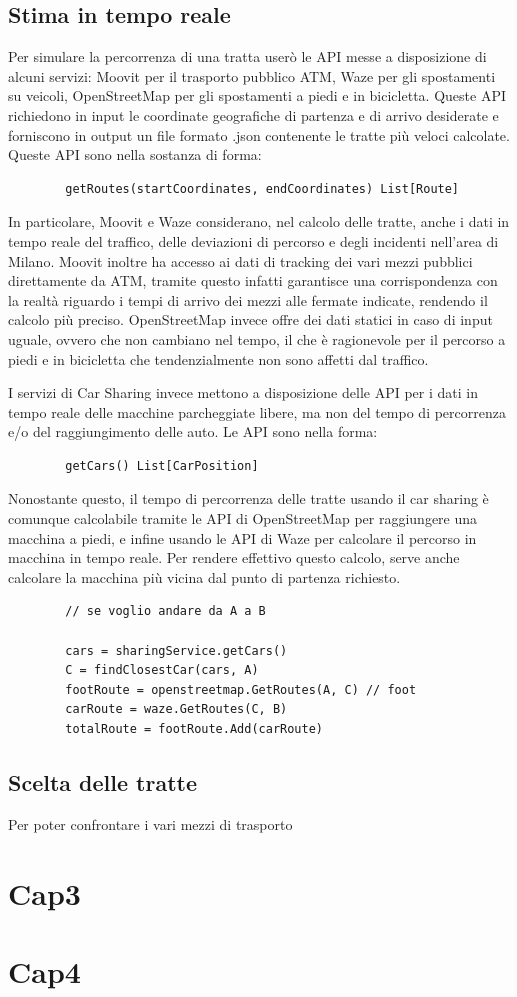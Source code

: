 \documentclass[a4paper]{report}
\begin{document}
		\section{Stima in tempo reale}
		{\large
			Per simulare la percorrenza di una tratta userò le API messe a disposizione di alcuni servizi: Moovit per il trasporto pubblico ATM, Waze per gli spostamenti su veicoli, OpenStreetMap per gli spostamenti a piedi e in bicicletta. Queste API richiedono in input le coordinate geografiche di partenza e di arrivo desiderate e forniscono in output un file formato .json contenente le tratte più veloci calcolate. Queste API sono nella sostanza di forma:
		}
	
		\begin{verbatim}
		getRoutes(startCoordinates, endCoordinates) List[Route]
		\end{verbatim}
	
		{\large
			In particolare, Moovit e Waze considerano, nel calcolo delle tratte, anche i dati in tempo reale del traffico, delle deviazioni di percorso e degli incidenti nell'area di Milano. Moovit inoltre ha accesso ai dati di tracking dei vari mezzi pubblici direttamente da ATM, tramite questo infatti garantisce una corrispondenza con la realtà riguardo i tempi di arrivo dei mezzi alle fermate indicate, rendendo il calcolo più preciso. OpenStreetMap invece offre dei dati statici in caso di input uguale, ovvero che non cambiano nel tempo, il che è ragionevole per il percorso a piedi e in bicicletta che tendenzialmente non sono affetti dal traffico.
		}
	
		{\large
			I servizi di Car Sharing invece mettono a disposizione delle API per i dati in tempo reale delle macchine parcheggiate libere, ma non del tempo di percorrenza e/o del raggiungimento delle auto. Le API sono nella forma:
		}
	
		\begin{verbatim}
		getCars() List[CarPosition]
		\end{verbatim}
	
		{\large
			Nonostante questo, il tempo di percorrenza delle tratte usando il car sharing è comunque calcolabile tramite le API di OpenStreetMap per raggiungere una macchina a piedi, e infine usando le API di Waze per calcolare il percorso in macchina in tempo reale. Per rendere effettivo questo calcolo, serve anche calcolare la macchina più vicina dal punto di partenza richiesto.
		}
	
		\begin{verbatim}
		// se voglio andare da A a B

		cars = sharingService.getCars()
		C = findClosestCar(cars, A)
		footRoute = openstreetmap.GetRoutes(A, C) // foot
		carRoute = waze.GetRoutes(C, B)
		totalRoute = footRoute.Add(carRoute)
		\end{verbatim}
		
		\section{Scelta delle tratte}
		{\large
			Per poter confrontare i vari mezzi di trasporto 
		}
			
	
	\chapter{Cap3}
	\chapter{Cap4}

	
	
\end{document}
